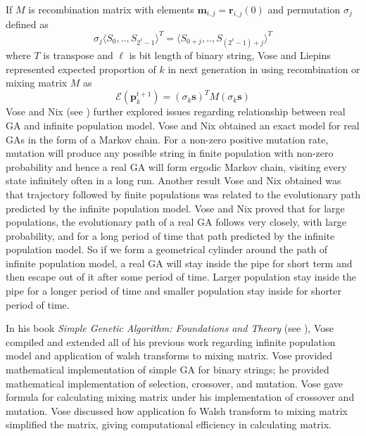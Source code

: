 If $M$ is recombination matrix with elements $\bm{m}_{i,j} = \bm{r}_{i,j}(0)$ and permutation $\sigma_j$ defined as 
\[
\sigma_j{\langle S_0,..,S_{2^\ell - 1} \rangle}^{T} = {\langle S_{0+j},..,S_{(2^\ell - 1)+j} \rangle}^{T}
\]
where $T$ is transpose and $\ell$ is bit length of binary string, Vose and Liepins represented expected proportion 
of $k$ in next generation in using recombination or mixing matrix $M$ as
\[
\mathcal{E}(\bm{p}_k^{t+1}) = (\sigma_k \bm{s})^T M (\sigma_k \bm{s})
\]
Vose and Nix (see \cite{Nix1992}) further explored issues regarding relationship between real GA and infinite population model. 
Vose and Nix obtained an exact model for real GAs in the form of a Markov chain. For a non-zero positive mutation rate, mutation 
will produce any possible string in finite population with non-zero probability and 
hence a real GA will form ergodic Markov chain, visiting every state infinitely often in a long run.
Another result Vose and Nix obtained was that trajectory followed by finite populations was related to 
the evolutionary path predicted by the infinite population model. 
Vose and Nix proved that for large populations, the evolutionary path of a real GA follows very closely, 
with large probability, and for a long period of time that path predicted by 
the infinite population model. So if we form 
a geometrical cylinder 
around the path of infinite population model, a real GA will stay inside the pipe for short term and 
then escape out of it after some period of time. 
Larger population stay inside the pipe for a longer period of time and smaller population stay inside for shorter period of time. 


In his book \textit{Simple Genetic Algorithm: Foundations and Theory} (see \cite{Vose1999}), Vose compiled and 
extended all of his previous work regarding infinite population model and application of walsh transforms to mixing matrix. 
Vose provided mathematical implementation of simple GA for binary strings; he provided mathematical implementation of 
selection, crossover, and mutation. Vose gave formula for calculating mixing matrix under his implementation of crossover 
and mutation. Vose discussed how application fo Walsh transform to mixing matrix simplified the matrix, giving 
computational efficiency in calculating matrix.

